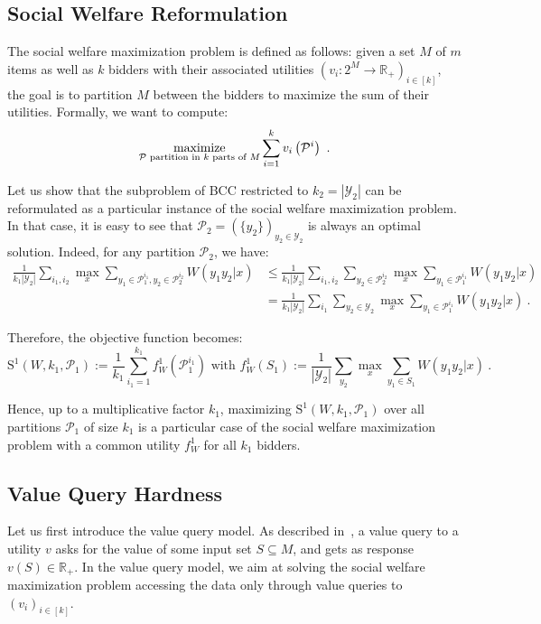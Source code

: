 \subsection{Social Welfare Reformulation}
The social welfare maximization problem is defined as follows: given a set $M$ of $m$ items as well as $k$ bidders with their associated utilities $\left(v_i : 2^M \rightarrow \mathbb{R}_+\right)_{i \in [k]}$, the goal is to partition $M$ between the bidders to maximize the sum of their utilities. Formally, we want to compute:
 \[ \underset{\mathcal{P} \text{ partition in $k$ parts of } M}{\operatorname{\text{maximize}}}\sum_{i=1}^k v_i\left(\mathcal{P}^i\right) \ . \]

 Let us show that the subproblem of \textsc{BCC} restricted to $k_2=|\mathcal{Y}_2|$ can be reformulated as a particular instance of the social welfare maximization problem. In that case, it is easy to see that $\mathcal{P}_2 = (\{y_2\})_{y_2 \in \mathcal{Y}_2}$ is always an optimal solution. Indeed, for any partition $\mathcal{P}_2$, we have:
\begin{equation}
  \begin{aligned}
    \frac{1}{k_1|\mathcal{Y}_2|}\sum_{i_1,i_2}  \max_x \sum_{y_1 \in \mathcal{P}_1^{i_1}, y_2 \in \mathcal{P}_2^{i_2}} W(y_1y_2|x) &\leq \frac{1}{k_1|\mathcal{Y}_2|}\sum_{i_1,i_2}  \sum_{y_2 \in \mathcal{P}_2^{i_2}} \max_x \sum_{y_1 \in \mathcal{P}_1^{i_1}} W(y_1y_2|x) \\
    &= \frac{1}{k_1|\mathcal{Y}_2|}\sum_{i_1}  \sum_{y_2 \in \mathcal{Y}_2} \max_x \sum_{y_1 \in \mathcal{P}_1^{i_1}} W(y_1y_2|x) \ .
  \end{aligned}
\end{equation}

Therefore, the objective function becomes:
\[ \mathrm{S}^1(W,k_1,\mathcal{P}_1) := \frac{1}{k_1}\sum_{i_1=1}^{k_1} f_W^1(\mathcal{P}_1^{i_1}) \text{ with } f_W^1(S_1) := \frac{1}{|\mathcal{Y}_2|}\sum_{y_2} \max_x \sum_{y_1 \in S_1} W(y_1y_2|x)\ .\]


Hence, up to a multiplicative factor $k_1$, maximizing $\mathrm{S}^1(W,k_1,\mathcal{P}_1)$ over all partitions $\mathcal{P}_1$ of size $k_1$ is a particular case of the social welfare maximization problem with a common utility $f_W^1$ for all $k_1$ bidders.

\subsection{Value Query Hardness}
Let us first introduce the value query model. As described in~\cite{DS06,MSV08}, a value query to a utility $v$ asks for the value of some input set $S \subseteq M$, and gets as response $v(S) \in \mathbb{R}_+$. In the value query model, we aim at solving the social welfare maximization problem accessing the data only through value queries to $(v_i)_{i \in [k]}$.

